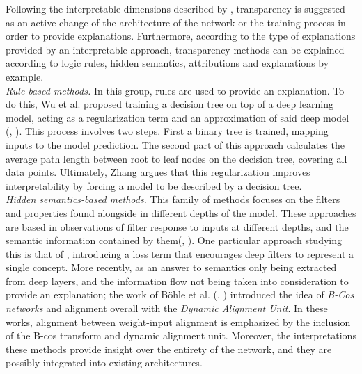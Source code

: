 \noindent Following the interpretable dimensions described by \autocite{zhang2021survey}, 
transparency is suggested as an active change of the architecture of the network or the training 
process in order to provide explanations. Furthermore, according to the type of explanations 
provided by an interpretable approach, transparency methods can be explained according to logic 
rules, hidden semantics, attributions and explanations by example.\\

\noindent \emph{Rule-based methods.} In this group, rules are used to provide an explanation. 
To do this, Wu et al. proposed training a decision tree on top of a deep learning model, acting as 
a regularization term and an approximation of said deep model (\cite{wu2018beyond}, 
\cite{wu2020regional}). This process involves two steps. First a binary tree is trained, mapping 
inputs to the model prediction. The second part of this approach calculates the average path 
length between root to leaf nodes on the decision tree, covering all data points. Ultimately, Zhang 
argues that this regularization improves interpretability by forcing a model to be described by a 
decision tree.\\

\noindent \emph{Hidden semantics-based methods.} This family of methods focuses on the filters 
and properties found alongside in different depths of the model. These approaches are based in 
observations of filter response to inputs at different depths, and the semantic information 
contained by them(\cite{bau2017network}, \cite{zhou2018interpreting}). 
One particular approach studying this is that of \autocite{zhang2018interpretable}, introducing a 
loss term that encourages deep filters to represent a single concept. More recently, as an answer to 
semantics only being extracted from deep layers, and the information flow not being taken into 
consideration to provide an explanation; the work of B\"ohle et al. (\cite{bohle2022b}, 
\cite{bohle2024b}) introduced the idea of \emph{B-Cos networks} and alignment overall with the 
\emph{Dynamic Alignment Unit}. In these works, alignment between weight-input alignment is 
emphasized by the inclusion of the B-cos transform and dynamic alignment unit. Moreover, the 
interpretations these methods provide insight over the entirety of the network, and they are 
possibly integrated into existing architectures.\\

